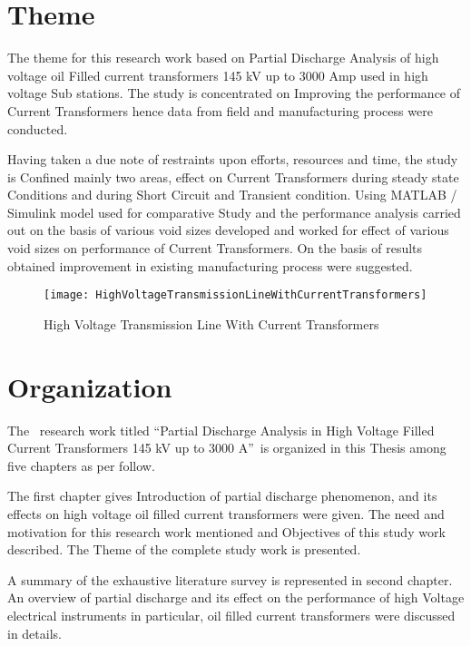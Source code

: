 \pagebreak 
\section{Theme}
The theme for this research work based on Partial Discharge Analysis of high voltage oil 
Filled current transformers 145 kV up to 3000 Amp used in high voltage Sub stations.
The study is concentrated on Improving the performance of Current Transformers hence
data from field and manufacturing process were conducted.\setlength{\parskip}{1em}
 
Having taken a due note of restraints upon efforts, resources and time, the study is
Confined mainly two areas, effect on Current Transformers during steady state Conditions
and during Short Circuit and Transient condition. Using MATLAB / Simulink model used
for comparative Study and the performance analysis carried out on the basis of various void
sizes developed and worked for effect of various void sizes on performance of Current 
Transformers. On the basis of results obtained improvement in existing manufacturing
process were suggested\setlength{\parskip}{0em}.

\begin{figure}[h!]
    \centering
    \texttt{[image: HighVoltageTransmissionLineWithCurrentTransformers]}
    \caption{High Voltage Transmission Line With Current Transformers}
    \label{fig:High Voltage Transmission Line With Current Transformers}
\end{figure}

\pagebreak 
\section{Organization}
The ~research work titled \textquotedblleft Partial Discharge Analysis in High Voltage Filled Current Transformers 145 kV up to 3000 A\textquotedblright ~is organized in this Thesis among five chapters as per follow.\setlength{\parskip}{1em}

The first chapter gives Introduction of partial discharge phenomenon, and its effects on high voltage oil filled current transformers were given. The need and motivation for this research work mentioned and Objectives of this study work described. The Theme of the complete study work is presented.

A summary of the exhaustive literature survey is represented in second chapter. An overview of partial discharge and its effect on the performance of high Voltage electrical instruments in particular, oil filled current transformers were discussed in details.

